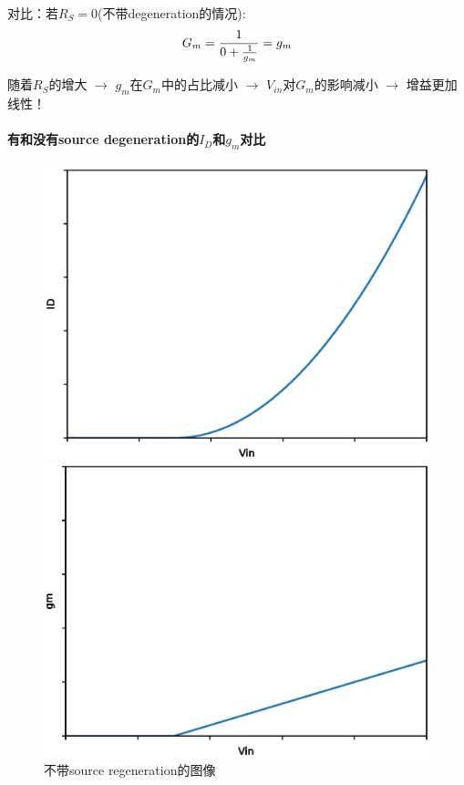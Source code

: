 \documentclass[twoside,a4paper,openright,titlepage,draft]{ctexrep}
\begin{document}
对比：若$R_S = 0$(不带degeneration的情况):
\begin{equation}
    G_m = \frac{1}{0 + {1 \over g_m}} = g_m
\end{equation}

随着$R_S$的增大 $\rightarrow$ $g_m$在$G_m$中的占比减小 $\rightarrow$ $V_{in}$对$G_m$的影响减小 $\rightarrow$ 增益更加线性！

\paragraph{有和没有source degeneration的$I_D$和$g_m$对比}
\newpage
\begin{figure}[H]
    \centering
    \begin{minipage}{0.49\linewidth}
        \centering
        \includegraphics[width=\linewidth]{nodegeneration1.eps}
    \end{minipage}
    \begin{minipage}{0.49\linewidth}
        \centering
        \includegraphics[width=\linewidth]{nodegeneration2.eps}
    \end{minipage}
    \caption{不带source regeneration的图像}
    \label{fig:不带degeneration的图像}
\end{figure}
\end{document}
